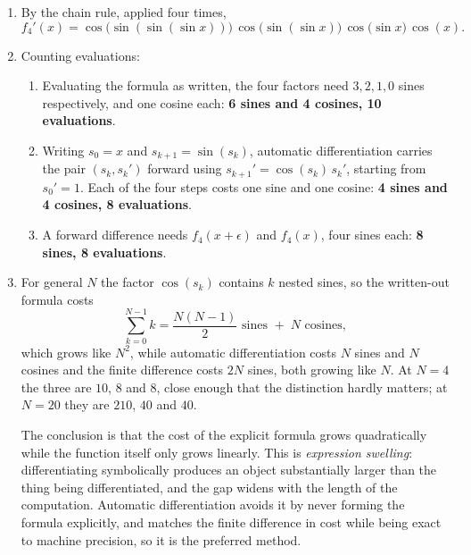 \begin{solution}
    
    \begin{enumerate}[label=(\alph*)]
        \item By the chain rule, applied four times,
        \[
            f_4'(x) = \cos\big(\sin(\sin(\sin x))\big)\,\cos\big(\sin(\sin x)\big)\,\cos\big(\sin x\big)\,\cos(x) .
        \]
        \item Counting evaluations:
        \begin{enumerate}[label=(\roman*)]
            \item Evaluating the formula as written, the four factors need $3, 2, 1, 0$ sines respectively, and one cosine each: \textbf{6 sines and 4 cosines, 10 evaluations}. 
            \item Writing $s_0 = x$ and $s_{k+1} = \sin(s_k)$, automatic differentiation carries the pair $(s_k, s_k')$ forward using $s_{k+1}' = \cos(s_k)\,s_k'$, starting from $s_0' = 1$. Each of the four steps costs one sine and one cosine: \textbf{4 sines and 4 cosines, 8 evaluations}.
            \item A forward difference needs $f_4(x+\epsilon)$ and $f_4(x)$, four sines each: \textbf{8 sines, 8 evaluations}.
        \end{enumerate}
        \item For general $N$ the factor $\cos(s_k)$ contains $k$ nested sines, so the written-out formula costs
        \[
            \sum_{k=0}^{N-1} k = \frac{N(N-1)}{2} \text{ sines } + \; N \text{ cosines} ,
        \]
        which grows like $N^2$, while automatic differentiation costs $N$ sines and $N$ cosines and the finite difference costs $2N$ sines, both growing like $N$. At $N = 4$ the three are $10$, $8$ and $8$, close enough that the distinction hardly matters; at $N = 20$ they are $210$, $40$ and $40$.

        The conclusion is that the cost of the explicit formula grows quadratically while the function itself only grows linearly. This is \emph{expression swelling}: differentiating symbolically produces an object substantially larger than the thing being differentiated, and the gap widens with the length of the computation. Automatic differentiation avoids it by never forming the formula explicitly, and matches the finite difference in cost while being exact to machine precision, so it is the preferred method.

    \end{enumerate}
    
\end{solution}

